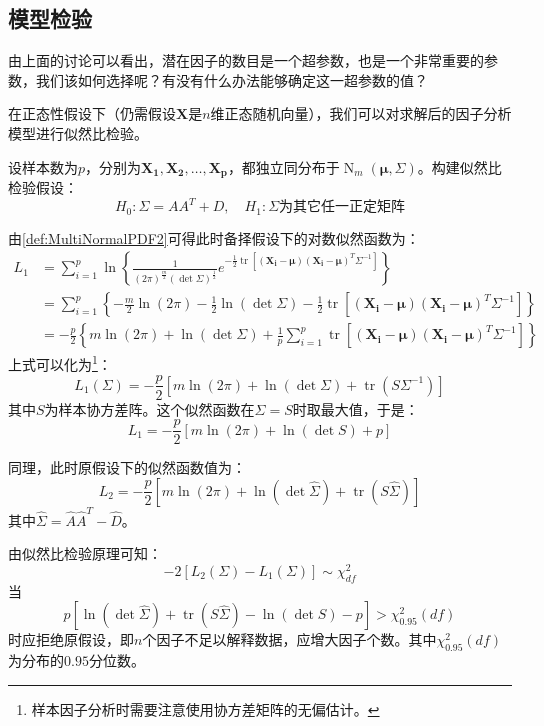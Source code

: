 \subsection{模型检验}
由上面的讨论可以看出，潜在因子的数目是一个超参数，也是一个非常重要的参数，我们该如何选择呢？有没有什么办法能够确定这一超参数的值？\par
\begin{derivation}
	在正态性假设下（仍需假设$\mathbf{X}$是$n$维正态随机向量），我们可以对求解后的因子分析模型进行似然比检验。\par
	设样本数为$p$，分别为$\mathbf{X_1},\mathbf{X_2},\dots,\mathbf{X_p}$，都独立同分布于$\operatorname{N}_m(\boldsymbol{\mu},\Sigma)$。构建似然比检验假设：
	\begin{equation*}
		H_0:\Sigma=AA^T+D,\quad H_1:\Sigma\text{为其它任一正定矩阵}
	\end{equation*}\par
	由\cref{def:MultiNormalPDF2}可得此时备择假设下的对数似然函数为：
	\begin{align*}
		L_1&=\sum_{i=1}^{p}\ln\left\{\frac{1}{(2\pi)^{\frac{m}{2}}(\det\Sigma)^{\frac{1}{2}}}e^{-\frac{1}{2}\operatorname{tr}[(\mathbf{X_i}-\boldsymbol{\mu})(\mathbf{X_i}-\boldsymbol{\mu})^T\Sigma^{-1}]}\right\} \\
		&=\sum_{i=1}^{p}\left\{-\frac{m}{2}\ln(2\pi)-\frac{1}{2}\ln(\det\Sigma)-\frac{1}{2}\operatorname{tr}[(\mathbf{X_i}-\boldsymbol{\mu})(\mathbf{X_i}-\boldsymbol{\mu})^T\Sigma^{-1}]\right\} \\
		&=-\frac{p}{2}\left\{m\ln(2\pi)+\ln(\det\Sigma)+\frac{1}{p}\sum_{i=1}^{p}\operatorname{tr}[(\mathbf{X_i}-\boldsymbol{\mu})(\mathbf{X_i}-\boldsymbol{\mu})^T\Sigma^{-1}]\right\}
	\end{align*}
	上式可以化为\footnote{样本因子分析时需要注意使用协方差矩阵的无偏估计。}：
	\begin{equation*}
		L_1(\Sigma)=-\frac{p}{2}\left[m\ln(2\pi)+\ln(\det\Sigma)+\operatorname{tr}(S\Sigma^{-1})\right]
	\end{equation*}
	其中$S$为样本协方差阵。这个似然函数在$\Sigma=S$时取最大值，于是：
	\begin{equation*}
		L_1=-\frac{p}{2}[m\ln(2\pi)+\ln(\det S)+p]
	\end{equation*}\par
	同理，此时原假设下的似然函数值为：
	\begin{equation*}
		L_2=-\frac{p}{2}\left[m\ln(2\pi)+\ln(\det\hat{\Sigma})+\operatorname{tr}(S\hat{\Sigma})\right]
	\end{equation*}
	其中$\hat{\Sigma}=\hat{A}\hat{A}^T-\hat{D}$。\par
	由似然比检验原理可知：
	\begin{equation*}
	-2[L_2(\Sigma)-L_1(\Sigma)]\sim\chi^2_{df}
	\end{equation*}
	当
	\begin{equation*}
		p[\ln(\det\hat{\Sigma})+\operatorname{tr}(S\hat{\Sigma})-\ln(\det S)-p]>\chi^2_{0.95}(df)
	\end{equation*}
	时应拒绝原假设，即$n$个因子不足以解释数据，应增大因子个数。其中$\chi^2_{0.95}(df)$为分布的$0.95$分位数。
\end{derivation}

